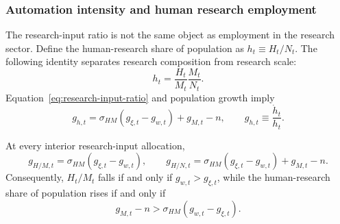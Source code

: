 \subsubsection{Automation intensity and human research employment}

The research-input ratio is not the same object as employment in the research
sector. Define the human-research share of population as $h_t\equiv H_t/N_t$.
The following identity separates research composition from research scale:
\begin{equation}
    h_t
    =
    \frac{H_t}{M_t}\frac{M_t}{N_t}.
    \label{eq:human-research-scale-identity}
\end{equation}
Equation~\eqref{eq:research-input-ratio} and population growth imply
\begin{equation}
    g_{h,t}
    =
    \sigma_{HM}\left(g_{\xi,t}-g_{w,t}\right)
    +g_{M,t}-n,
    \qquad
    g_{h,t}\equiv\frac{\dot h_t}{h_t}.
    \label{eq:human-research-share-growth}
\end{equation}

\begin{proposition}
\label{prop:research-employment-scale}
At every interior research-input allocation,
\begin{equation}
    g_{H/M,t}
    =
    \sigma_{HM}(g_{\xi,t}-g_{w,t}),
    \qquad
    g_{H/N,t}
    =
    \sigma_{HM}(g_{\xi,t}-g_{w,t})+g_{M,t}-n.
    \label{eq:research-composition-and-scale-identities}
\end{equation}
Consequently, $H_t/M_t$ falls if and only if $g_{w,t}>g_{\xi,t}$, while the
human-research share of population rises if and only if
\begin{equation}
    g_{M,t}-n
    >
    \sigma_{HM}\left(g_{w,t}-g_{\xi,t}\right).
    \label{eq:human-research-expansion-condition}
\end{equation}
\end{proposition}

